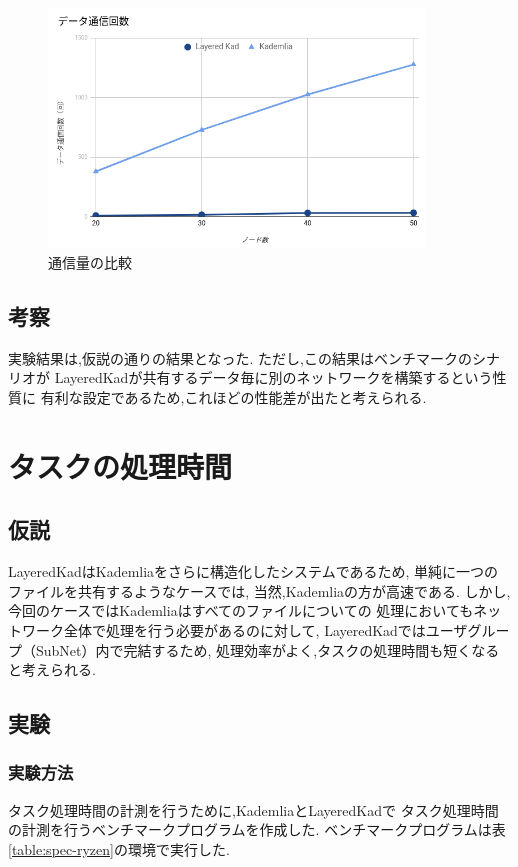 \documentclass[sotsuron]{jcsie}
\begin{document}
\begin{figure}[H]
	\centering
	\includegraphics[width=10cm]{./assets/image/traffic_graph.png}
	\caption{通信量の比較}
	\label{fig:traffic-graph}
\end{figure}

\subsection{考察}
実験結果は,仮説の通りの結果となった.
ただし,この結果はベンチマークのシナリオが
LayeredKadが共有するデータ毎に別のネットワークを構築するという性質に
有利な設定であるため,これほどの性能差が出たと考えられる.

\section{タスクの処理時間}
\subsection{仮説}
LayeredKadはKademliaをさらに構造化したシステムであるため,
単純に一つのファイルを共有するようなケースでは,
当然,Kademliaの方が高速である.
しかし,今回のケースではKademliaはすべてのファイルについての
処理においてもネットワーク全体で処理を行う必要があるのに対して,
LayeredKadではユーザグループ（SubNet）内で完結するため,
処理効率がよく,タスクの処理時間も短くなると考えられる.
\subsection{実験}
\subsubsection{実験方法}
タスク処理時間の計測を行うために,KademliaとLayeredKadで
タスク処理時間の計測を行うベンチマークプログラムを作成した.
ベンチマークプログラムは表\ref{table:spec-ryzen}の環境で実行した.
\end{document}
